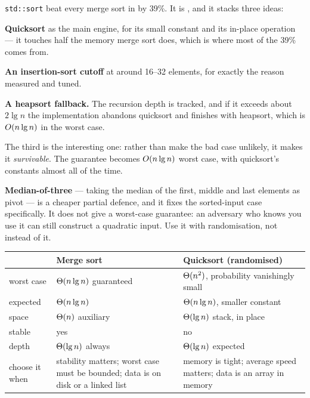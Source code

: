 \begin{conceptbox}
\texttt{std::sort} beat every merge sort in  by 39\%. It is
, and it stacks three ideas:

\begin{tightnum}
  \item \textbf{Quicksort} as the main engine, for its small constant and its
        in-place operation --- it touches half the memory merge sort does,
        which is where most of the 39\% comes from.
  \item \textbf{An insertion-sort cutoff} at around 16--32 elements, for
        exactly the reason  measured and  tuned.
  \item \textbf{A heapsort fallback.} The recursion depth is tracked, and if it
        exceeds about $2\lg n$ the implementation abandons quicksort and
        finishes with heapsort, which is $O(n\operatorname{lg} n)$ in the worst case.
\end{tightnum}

\smallskip
The third is the interesting one: rather than make the bad case unlikely, it
makes it \emph{survivable}. The guarantee becomes $O(n\operatorname{lg} n)$ worst case,
with quicksort's constants almost all of the time.

\smallskip
\textbf{Median-of-three} --- taking the median of the first, middle and last
elements as pivot --- is a cheaper partial defence, and it fixes the
sorted-input case specifically. It does not give a worst-case guarantee: an
adversary who knows you use it can still construct a quadratic input. Use it
with randomisation, not instead of it.
\end{conceptbox}

\begin{conceptbox}
\begin{longtable}{@{}L{3.4cm}L{5.0cm}L{5.6cm}@{}}
\toprule
{}
& \textbf{Merge sort} & \textbf{Quicksort (randomised)} \\
\midrule
\endhead
worst case & $\Theta(n\operatorname{lg} n)$ guaranteed & $\Theta(n^{2})$, probability
  vanishingly small \\
expected & $\Theta(n\operatorname{lg} n)$ & $\Theta(n\operatorname{lg} n)$, smaller constant \\
space & $\Theta(n)$ auxiliary & $\Theta(\operatorname{lg} n)$ stack, in place \\
stable & yes & no \\
depth & $\Theta(\operatorname{lg} n)$ always & $\Theta(\operatorname{lg} n)$ expected \\
choose it when & stability matters; worst case must be bounded; data is on
  disk or a linked list & memory is tight; average speed matters; data is an
  array in memory \\
\bottomrule
\end{longtable}
\end{conceptbox}

